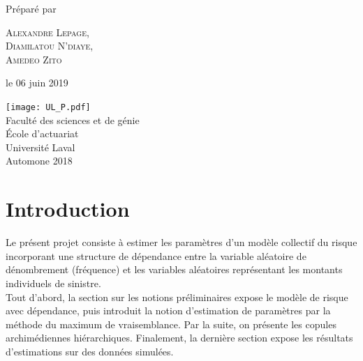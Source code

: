 \documentclass{article}
\begin{document}
\begin{titlepage}
		Préparé par
		
		\vspace{0.5\baselineskip} %
		
		{\scshape\Large Alexandre Lepage, \\
			Diamilatou N'diaye, \\ Amedeo Zito \\} %
		
		\vspace*{5\baselineskip}
		
		le 06 juin 2019
		
		\vspace{0.5\baselineskip} %
		
		\vfill %
		
		
		\texttt{[image: UL\_P.pdf]}\\
		
		Faculté des sciences et de génie\\
		École d'actuariat\\
		Université Laval\\
		Automone 2018       
		
	\end{titlepage}
	
	\setcounter{page}{0}
	
	\newpage
	\strut %
	\newpage
	
	\tableofcontents	
	\renewcommand{\listfigurename}{Liste des illustrations}
	\listoffigures
	\listoftables
	\newpage
	
	\setcounter{page}{1}
	
	\section{Introduction}
	Le présent projet consiste à estimer les paramètres d'un modèle collectif du risque incorporant une structure de dépendance entre la variable aléatoire de dénombrement (fréquence) et les variables aléatoires représentant les montants individuels de sinistre.\\
	
	Tout d'abord, la section sur les notions préliminaires expose le modèle de risque avec dépendance, puis introduit la notion d'estimation de paramètres par la méthode du maximum de vraisemblance. Par la suite, on présente les copules archimédiennes hiérarchiques.
	Finalement, la dernière section expose les résultats d'estimations sur des données simulées.
	
\end{document}
